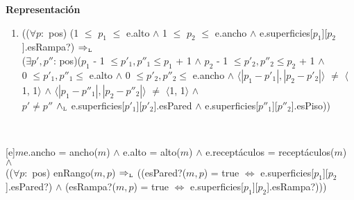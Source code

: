 \documentclass[a4paper,10pt]{article}
\newenvironment{Representacion}{%
  \vspace*{2ex}%
  \noindent\textbf{\Large Representación}%
  \vspace*{2ex}%
}{}
\begin{document}
\begin{Representacion}
\begin{enumerate}
      \item (($\forall p:$ pos) (1 $\leq$ $p_{1}$ $\leq$ e.alto $\land$ 1 $\leq$ $p_{2}$ $\leq$ e.ancho $\land$
            e.superficies[$p_{1}$][$p_{2}$].esRampa?) $\Rightarrow_{\mathrm{\scriptscriptstyle{L}}}$ \\
            ($\exists p', p''$: pos)($p_{1}$ - 1 $\leq p'_{1}, p''_{1} \leq p_{1}$ + 1 $\land$ $p_{2}$ - 1 $\leq p'_{2}, p''_{2} \leq p_{2}$ + 1 $\land$ \\ 
            0 $\leq p'_{1}, p''_{1} \leq$ e.alto $\land$ 0 $\leq p'_{2}, p''_{2} \leq$ e.ancho $\land$
            $\langle|p_{1} - p'_{1}|, |p_{2} - p'_{2}|\rangle$ $\neq$ $\langle$1, 1$\rangle$ $\land$ 
            $\langle|p_{1} - p''_{1}|, |p_{2} - p''_{2}|\rangle$ $\neq$ $\langle$1, 1$\rangle$ $\land$ \\ 
            $p' \neq p''$ $\land_{\mathrm{\scriptscriptstyle{L}}}$ e.superficies[$p'_{1}$][$p'_{2}$].esPared $\land$ e.superficies[$p''_{1}$][$p''_{2}$].esPiso))
  \end{enumerate}
  
  

  ~

  [e]{$m$}{e.ancho = ancho($m$) $\land$ e.alto = alto($m$) $\land$ e.receptáculos = receptáculos($m$) $\land$ \\
  (($\forall p:$ pos) enRango($m, p$) $\Rightarrow_{\mathrm{\scriptscriptstyle{L}}}$ ((esPared?($m, p$) = true $\iff$ e.superficies[$p_{1}$][$p_{2}$].esPared?) $\land$ (esRampa?($m, p$) = true $\iff$ e.superficies[$p_{1}$][$p_{2}$].esRampa?)))}\mbox{}

 

\end{Representacion}

\newpage
\end{document}
